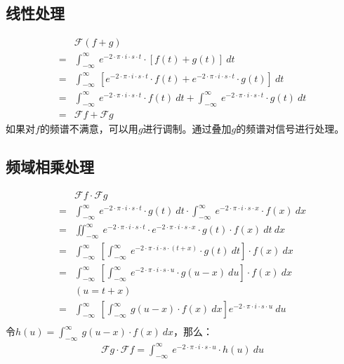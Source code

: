 \subsection{线性处理}
\begin{align*}
	  & \mathcal{F}(f+g)                                                                                                                                        \\
	= & \int_{-\infty}^{\infty}\ e^{-2\cdot \pi\cdot i\cdot s\cdot t}\cdot [f(t)+g(t)]\ dt                                                                      \\
	= & \int_{-\infty}^{\infty}\ [e^{-2\cdot \pi\cdot i\cdot s\cdot t}\cdot f(t)+e^{-2\cdot \pi\cdot i\cdot s\cdot t}\cdot g(t)]\ dt                            \\
	= & \int_{-\infty}^{\infty}\ e^{-2\cdot \pi\cdot i\cdot s\cdot t}\cdot f(t)\ dt+\int_{-\infty}^{\infty}\ e^{-2\cdot \pi\cdot i\cdot s\cdot t}\cdot g(t)\ dt \\
	= & \mathcal{F}f+\mathcal{F}g
\end{align*}
如果对$f$的频谱不满意，可以用$g$进行调制。通过叠加$g$的频谱对信号进行处理。
\subsection{频域相乘处理}
\begin{align*}
	  & \mathcal{F}f\cdot \mathcal{F}g                                                                                                                               \\
	= & \int_{-\infty}^{\infty}\ e^{-2\cdot \pi\cdot i\cdot s\cdot t}\cdot g(t)\ dt\cdot \int_{-\infty}^{\infty}\ e^{-2\cdot \pi\cdot i\cdot s\cdot x}\cdot f(x)\ dx \\
	= & \iint_{-\infty}^{\infty}\ e^{-2\cdot \pi\cdot i\cdot s\cdot t}\cdot e^{-2\cdot \pi\cdot i\cdot s\cdot x}\cdot g(t)\cdot f(x)\ dt\ dx                         \\
	= & \int_{-\infty}^{\infty}\ [\int_{-\infty}^{\infty}\ e^{-2\cdot \pi\cdot i\cdot s\cdot (t+x)}\cdot g(t)\ dt]\cdot f(x)\ dx                                     \\
	= & \int_{-\infty}^{\infty}\ [\int_{-\infty}^{\infty}\ e^{-2\cdot \pi\cdot i\cdot s\cdot u}\cdot g(u-x)\ du]\cdot f(x)\ dx                                       \\
	  & (u=t+x)                                                                                                                                                      \\
	= & \int_{-\infty}^{\infty}\ [\int_{-\infty}^{\infty}\ g(u-x)\cdot f(x)\ dx]e^{-2\cdot \pi\cdot i\cdot s\cdot u}\ du                                             \\
\end{align*}
令$h(u)=\int_{-\infty}^{\infty}\ g(u-x)\cdot f(x)\ dx$，那么：
\begin{align*}
	\mathcal{F}g\cdot \mathcal{F}f=\int_{-\infty}^{\infty}\ e^{-2\cdot \pi\cdot i\cdot s\cdot u}\cdot h(u)\ du
\end{align*}

